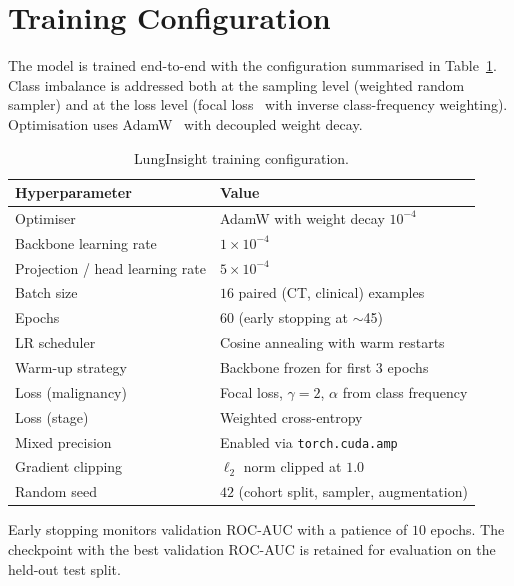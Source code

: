 \section{Training Configuration}
\label{sec:appB-training}

The model is trained end-to-end with the configuration summarised in
Table~\ref{tab:appendix2-training}. Class imbalance is addressed both at the
sampling level (weighted random sampler) and at the loss level (focal
loss~\cite{lin2017focal} with inverse class-frequency weighting). Optimisation
uses AdamW~\cite{loshchilov2019decoupled} with decoupled weight decay.

\begin{table}[H]
\centering
\caption{LungInsight training configuration.}
\label{tab:appendix2-training}
\begin{tabular}{l p{}}
\toprule
\textbf{Hyperparameter} & \textbf{Value} \\
\midrule
Optimiser                       & AdamW with weight decay $10^{-4}$~\cite{loshchilov2019decoupled} \\
Backbone learning rate          & $1 \times 10^{-4}$ \\
Projection / head learning rate & $5 \times 10^{-4}$ \\
Batch size                      & $16$ paired (CT, clinical) examples \\
Epochs                          & $60$ (early stopping at $\sim$45) \\
LR scheduler                    & Cosine annealing with warm restarts \\
Warm-up strategy                & Backbone frozen for first $3$ epochs \\
Loss (malignancy)               & Focal loss, $\gamma = 2$, $\alpha$ from class frequency \\
Loss (stage)                    & Weighted cross-entropy \\
Mixed precision                 & Enabled via \texttt{torch.cuda.amp} \\
Gradient clipping               & $\ell_{2}$ norm clipped at $1.0$ \\
Random seed                     & $42$ (cohort split, sampler, augmentation) \\
\bottomrule
\end{tabular}
\end{table}

Early stopping monitors validation ROC-AUC with a patience of $10$ epochs.
The checkpoint with the best validation ROC-AUC is retained for evaluation on
the held-out test split.

